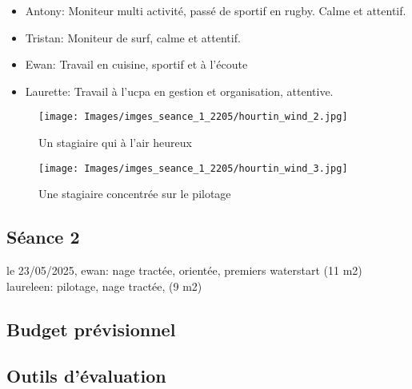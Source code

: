 \documentclass[12pt,a4paper]{report}
\begin{document}
\begin{itemize}
\item Antony: Moniteur multi activité, passé de sportif en rugby. Calme et attentif.
\item Tristan: Moniteur de surf, calme et attentif.
\item Ewan: Travail en cuisine, sportif et à l'écoute
\item Laurette: Travail à l'ucpa en gestion et organisation, attentive.
\end{itemize}
\begin{figure}
\begin{minipage}{0.4\textwidth}
\texttt{[image: Images/imges\_seance\_1\_2205/hourtin\_wind\_2.jpg]} 
\caption{Un stagiaire qui à l'air heureux}
\end{minipage}
\hfill
\begin{minipage}{0.4\textwidth}
\texttt{[image: Images/imges\_seance\_1\_2205/hourtin\_wind\_3.jpg]} 
\caption{Une stagiaire concentrée sur le pilotage}
\end{minipage}
\end{figure}
\subsection{Séance 2}

le 23/05/2025, 
ewan: nage tractée, orientée, premiers waterstart (11 m2)
laureleen: pilotage, nage tractée, (9 m2)


\subsection{Budget prévisionnel}
\subsection{Outils d'évaluation}
\end{document}
